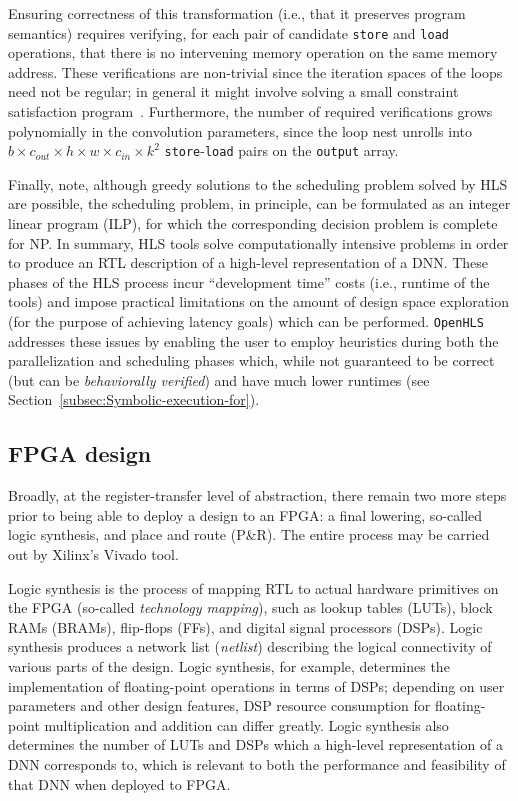 \documentclass[10pt]{sig-alternate}
\begin{document}
Ensuring correctness of this transformation (i.e., that it preserves program
semantics) requires verifying, for each pair of candidate \texttt{store} and \texttt{load}
operations, that there is no intervening memory
operation on the same memory address. These verifications are non-trivial
since the iteration spaces of the loops need not be regular; in general
it might involve solving a small constraint satisfaction program~\cite{rajopadhye2002dependence}.
Furthermore, the number of required verifications grows polynomially in
the convolution parameters, since the loop nest unrolls into
$b\times c_{out}\times h\times w\times c_{in}\times k^{2}$ \texttt{store}-\texttt{load}
pairs on the \texttt{output} array.

Finally, note, although greedy solutions to the scheduling problem solved
by HLS are possible, the scheduling problem, in principle, can be formulated
as an integer linear program (ILP), for which the corresponding decision problem is complete for NP.
In summary, HLS tools solve computationally intensive problems in
order to produce an RTL description of a high-level representation
of a DNN. These phases of the HLS process incur ``development time''
costs (i.e., runtime of the tools) and impose practical limitations
on the amount of design space exploration (for the purpose of achieving
latency goals) which can be performed. \texttt{OpenHLS} addresses
these issues by enabling the user to employ heuristics during both
the parallelization and scheduling phases which, while not guaranteed
to be correct (but can be \emph{behaviorally verified}) and have much
lower runtimes (see Section~\ref{subsec:Symbolic-execution-for}).

\subsection{FPGA design}

Broadly, at the register-transfer level of abstraction, there remain
two more steps prior to being able to deploy a design to
an FPGA: a final lowering, so-called logic synthesis,
and place and route (P\&R). The entire process may be
carried out by Xilinx's Vivado tool.

Logic synthesis is the process of mapping RTL to actual hardware primitives
on the FPGA (so-called \emph{technology mapping}), such as lookup
tables (LUTs), block RAMs (BRAMs), flip-flops (FFs), and digital signal
processors (DSPs). Logic synthesis produces a network list (\emph{netlist})
describing the logical connectivity of various parts of the design.
Logic synthesis, for example, determines the implementation of floating-point
operations in terms of DSPs; depending on user parameters and other
design features, DSP resource consumption for floating-point multiplication
and addition can differ greatly. Logic synthesis also determines the
number of LUTs and DSPs which a high-level representation of a DNN
corresponds to, which is relevant to both the performance and feasibility of that DNN when deployed to FPGA.
\end{document}
